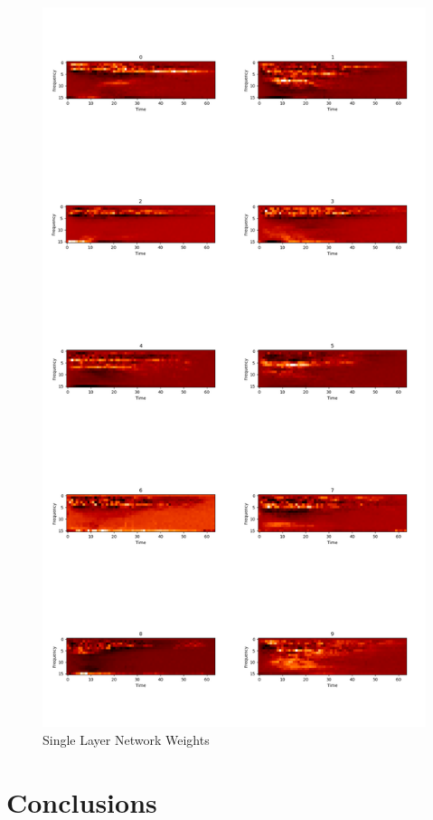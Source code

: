\documentclass[10pt,a4paper]{report}
\begin{document}
\begin{figure}[!ht]
\centering
\includegraphics[scale=0.12]{nn_spec.png}
\caption{Single Layer Network Weights}
\label{fig:nn_spect}
\end{figure}
\section{Conclusions}
\end{document}
